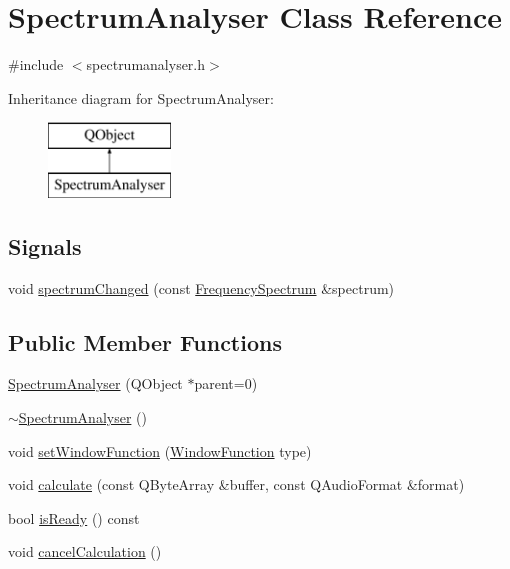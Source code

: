 \hypertarget{class_spectrum_analyser}{}\section{Spectrum\+Analyser Class Reference}
\label{class_spectrum_analyser}


{\ttfamily \#include $<$spectrumanalyser.\+h$>$}

Inheritance diagram for Spectrum\+Analyser\+:\begin{figure}[H]
\begin{center}
\leavevmode
\includegraphics[height=2.000000cm]{class_spectrum_analyser}
\end{center}
\end{figure}
\subsection*{Signals}
\begin{DoxyCompactItemize}
\item 
void \hyperlink{class_spectrum_analyser_af2dd8d387193fa6743ac15d3f8163ee0}{spectrum\+Changed} (const \hyperlink{class_frequency_spectrum}{Frequency\+Spectrum} \&spectrum)
\end{DoxyCompactItemize}
\subsection*{Public Member Functions}
\begin{DoxyCompactItemize}
\item 
\hyperlink{class_spectrum_analyser_abf706ac78327bc590b90b586086c0cd5}{Spectrum\+Analyser} (Q\+Object $\ast$parent=0)
\item 
\hyperlink{class_spectrum_analyser_a3737f48dd1d95b09aeeaf3e1f081591e}{$\sim$\+Spectrum\+Analyser} ()
\item 
void \hyperlink{class_spectrum_analyser_a6aeb6c39dd89dd5c5881198ae413ec74}{set\+Window\+Function} (\hyperlink{spectrum_8h_adae4545e1609513867a86cc5e91fc1d4}{Window\+Function} type)
\item 
void \hyperlink{class_spectrum_analyser_aecd698124fcdd83760b9e808f003e1a6}{calculate} (const Q\+Byte\+Array \&buffer, const Q\+Audio\+Format \&format)
\item 
bool \hyperlink{class_spectrum_analyser_acac3bd1ac5fc255c01ea0288e50fee6c}{is\+Ready} () const
\item 
void \hyperlink{class_spectrum_analyser_a1ed17c67c3676facec7e987512eaa962}{cancel\+Calculation} ()
\end{DoxyCompactItemize}


